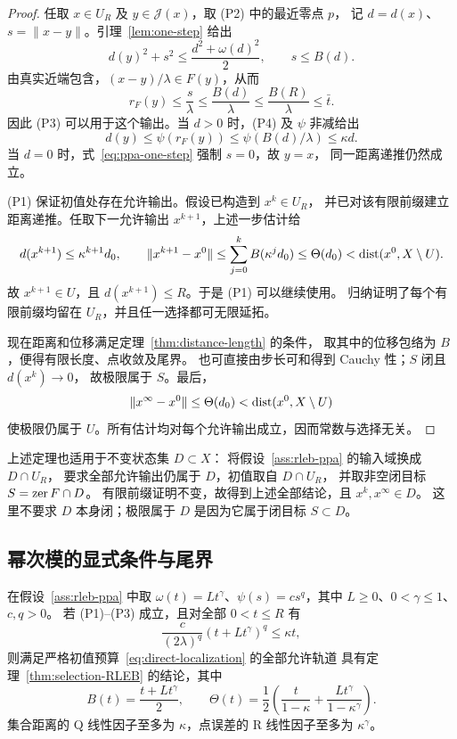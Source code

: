\begin{proof}
任取 $x\in U_R$ 及 $y\in\mathcal J(x)$，取 (P2) 中的最近零点 $p$，
记 $d=d(x)$、$s=\|x-y\|$。引理~\ref{lem:one-step} 给出
\begin{equation}
\label{eq:ppa-one-step}
 d(y)^2+s^2\le\frac{d^2+\omega(d)^2}{2},\qquad s\le B(d).
\end{equation}
由真实近端包含，$(x-y)/\lambda\in F(y)$，从而
\[
 r_F(y)\le\frac{s}\lambda\le\frac{B(d)}\lambda
 \le\frac{B(R)}\lambda\le\bar t.
\]
因此 (P3) 可以用于这个输出。当 $d>0$ 时，(P4) 及 $\psi$ 非减给出
\[
 d(y)\le\psi(r_F(y))\le\psi(B(d)/\lambda)\le\kappa d.
\]
当 $d=0$ 时，式~\eqref{eq:ppa-one-step} 强制 $s=0$，故 $y=x$，
同一距离递推仍然成立。

(P1) 保证初值处存在允许输出。假设已构造到 $x^k\in U_R$，
并已对该有限前缀建立距离递推。任取下一允许输出 $x^{k+1}$，上述一步估计给
\[
 d(x^{k+1})\le\kappa^{k+1}d_0,\qquad
 \|x^{k+1}-x^0\|
 \le\sum_{j=0}^{k}B(\kappa^jd_0)
 \le\Theta(d_0)<\operatorname{dist}(x^0,X\setminus U).
\]
故 $x^{k+1}\in U$，且 $d(x^{k+1})\le R$。于是 (P1) 可以继续使用。
归纳证明了每个有限前缀均留在 $U_R$，并且任一选择都可无限延拓。

现在距离和位移满足定理~\ref{thm:distance-length} 的条件，
取其中的位移包络为 $B$，便得有限长度、点收敛及尾界。
也可直接由步长可和得到 Cauchy 性；$S$ 闭且 $d(x^k)\to0$，
故极限属于 $S$。最后，
\[
 \|x^\infty-x^0\|\le\Theta(d_0)<\operatorname{dist}(x^0,X\setminus U)
\]
使极限仍属于 $U$。所有估计均对每个允许输出成立，因而常数与选择无关。
\end{proof}

\begin{remark}[相对状态集]
\label{rem:relative-state}
上述定理也适用于不变状态集 $D\subset X$：
将假设~\ref{ass:rleb-ppa} 的输入域换成 $D\cap U_R$，
要求全部允许输出仍属于 $D$，初值取自 $D\cap U_R$，
并取非空闭目标 $S=\operatorname{zer} F\cap D$。
有限前缀证明不变，故得到上述全部结论，且 $x^k,x^\infty\in D$。
这里不要求 $D$ 本身闭；极限属于 $D$ 是因为它属于闭目标 $S\subset D$。
\end{remark}

\subsection{幂次模的显式条件与尾界}

\begin{corollary}[幂次 RLEB 条件]
\label{cor:power-RLEB}
在假设~\ref{ass:rleb-ppa} 中取
$\omega(t)=Lt^\gamma$、$\psi(s)=cs^q$，其中
$L\ge0$、$0<\gamma\le1$、$c,q>0$。
若 (P1)--(P3) 成立，且对全部 $0<t\le R$ 有
\begin{equation}
\label{eq:power-compatibility}
 \frac{c}{(2\lambda)^q}(t+Lt^\gamma)^q\le\kappa t,
\end{equation}
则满足严格初值预算~\eqref{eq:direct-localization} 的全部允许轨道
具有定理~\ref{thm:selection-RLEB} 的结论，其中
\begin{equation}
\label{eq:power-tail}
 B(t)=\frac{t+Lt^\gamma}{2},\qquad
 \Theta(t)=\frac12\left(
 \frac{t}{1-\kappa}+\frac{Lt^\gamma}{1-\kappa^\gamma}\right).
\end{equation}
集合距离的 Q 线性因子至多为 $\kappa$，点误差的 R 线性因子至多为 $\kappa^\gamma$。
\end{corollary}

